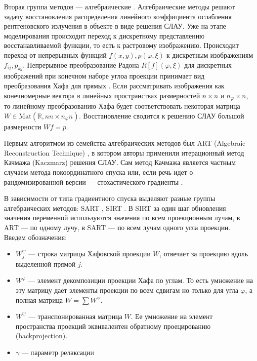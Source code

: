 Вторая группа методов --- алгебраические \cite{algebraic_methods}. 
Алгебраические методы решают задачу восстановления распределения линейного коэффициента ослабления рентгеновского излучения в объекте в виде решения СЛАУ.
Уже на этапе моделирования происходит переход к дискретному представлению восстанавливаемой функции, то есть к растровому изображению.
Происходит переход от непрерывных функций $f(x,y), p(\varphi, \xi)$ к дискретным изображениям $f_{ij}, p_{kj}$.
Непрерывное преобразование Радона $R[f](\varphi, \xi)$ для дискретных изображений при конечном наборе углоа проекции принимает вид преобразования Хафа для прямых \cite{Ginkel04ashort}.
Если рассматривать изображения как конечномерные вектора в линейных пространствах размерностей $n \times n$ и $n_\varphi \times n$, то линейному преобразованию Хафа будет соответствовать некоторая матрица $W \in \mathrm{Mat}(\mathbb R, n n \times n_\varphi n)$.
Восстановление сводится к решению СЛАУ большой размерности $Wf = p$.

Первым алгоритмом из семейства алгебраических методов был ART (Algebraic Reconstruction Technique) \cite{GORDON1970471}, в котором авторы применили итерационный метод Качмажа (Kaczmarz) \cite{Kaczmarz1937} решения СЛАУ.
Сам метод Качмажа является частным случаем метода покоординатного спуска или, если речь идет о рандомизированной версии --- стохастического градиенты \cite{needell2014stochastic}.

В зависимости от типа градиентного спуска выделяют разные группы алгебраических методов: SART \cite{sart}, SIRT \cite{GILBERTSIRT, gregor2008computational}.
В SIRT за один шаг обновления значения переменной используются значения по всем проекционным лучам, в ART --- по одному лучу, в SART --- по всем лучам одного угла проекции.
Введем обозначения: 

\begin{itemize}
	\item $W^{\mathrm T}_j$ --- строка матрицы Хафовской проекции $W$, отвечает за проекцию вдоль выделенной прямой $j$.
	\item $W^\varphi$ --- элемент декомпозиции проекции Хафа по углам. То есть умножение на эту матрицу дает элементы проекции по всем сдвигам но только для угла $\varphi$, а полная матрица $W = \sum W^\varphi$.
	\item $W^{\mathrm T}$ --- транспонированная матрица $W$. Ее умножение на элемент пространства проекций эквивалентен обратному проецированию (backprojection).
	\item $\gamma$ --- параметр релаксации
\end{itemize}

